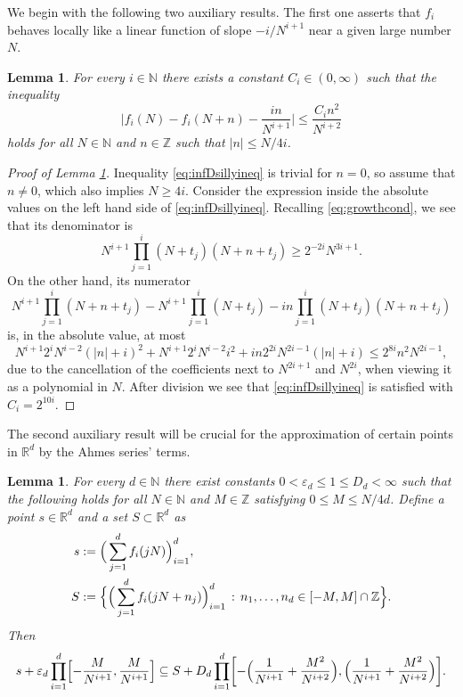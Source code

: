 \documentclass[11pt,letterpaper,reqno]{amsart}
\numberwithin{equation}{section}
\newtheorem{lemma}[theorem]{Lemma}
\theoremstyle{definition}
\numberwithin{equation}{section}
\begin{document}
We begin with the following two auxiliary results.
The first one asserts that $f_i$ behaves locally like a linear function of slope $-i/N^{i+1}$ near a given large number $N$.

\begin{lemma}\label{lm:infDest}
For every $i\in\mathbb{N}$ there exists a constant $C_i\in(0,\infty)$ such that the inequality
\begin{equation}\label{eq:infDsillyineq}
\Big| f_i(N) - f_i(N+n) - \frac{i n}{N^{i+1}} \Big| \leqslant \frac{C_i n^2}{N^{i+2}}
\end{equation}
holds for all $N\in\mathbb{N}$ and $n\in\mathbb{Z}$ such that $|n|\leqslant N/4i$.
\end{lemma}

\begin{proof}[Proof of Lemma \ref{lm:infDest}]
Inequality \eqref{eq:infDsillyineq} is trivial for $n=0$, so assume that $n\neq 0$, which also implies $N\geqslant 4i$.
Consider the expression inside the absolute values on the left hand side of \eqref{eq:infDsillyineq}.
Recalling \eqref{eq:growthcond}, we see that its denominator is
\[ N^{i+1} \prod_{j=1}^{i} (N+t_j)(N+n+t_j) \geqslant 2^{-2i} N^{3i+1}. \]
On the other hand, its numerator
\[ N^{i+1} \prod_{j=1}^{i} (N+n+t_j) - N^{i+1} \prod_{j=1}^{i} (N+t_j) - i n \prod_{j=1}^{i} (N+t_j)(N+n+t_j) \]
is, in the absolute value, at most
\[
N^{i+1} 2^i N^{i-2} (|n|+i)^2
+ N^{i+1} 2^i N^{i-2} i^2
+ i n 2^{2i} N^{2i-1} (|n|+i)
\leqslant 2^{8i} n^2 N^{2i-1},
\]
due to the cancellation of the coefficients next to $N^{2i+1}$ and $N^{2i}$, when viewing it as a polynomial in $N$.
After division we see that \eqref{eq:infDsillyineq} is satisfied with $C_i = 2^{10i}$.
\end{proof}

The second auxiliary result will be crucial for the approximation of certain points in $\mathbb{R}^d$ by the Ahmes series' terms.

\begin{lemma}\label{lm:quantest}
For every $d\in\mathbb{N}$ there exist constants $0<\varepsilon_d\leqslant 1\leqslant D_d<\infty$ such that the following holds for all $N\in\mathbb{N}$ and $M\in\mathbb{Z}$ satisfying $0\leqslant M\leqslant N/4d$.
Define a point $s\in\mathbb{R}^d$ and a set $S\subset\mathbb{R}^d$ as
\begin{align*}
s & := \Big( \sum_{j=1}^{d} f_i(j N) \Big)_{i=1}^{d}, \\
S & := \Bigl\{ \Big( \sum_{j=1}^{d} f_i(j N + n_j) \Big)_{i=1}^{d} \,:\, n_1,\ldots,n_d\in[-M,M]\cap\mathbb{Z} \Bigr\}.
\end{align*}
Then
\begin{equation}\label{eq:mainsubset}
s + \varepsilon_d \prod_{i=1}^{d} \Bigl[ -\frac{M}{N^{i+1}}, \frac{M}{N^{i+1}} \Bigr]
\subseteq S + D_d \prod_{i=1}^{d} \biggl[ -\Big( \frac{1}{N^{i+1}} +\frac{M^2}{N^{i+2}} \Big), \Big( \frac{1}{N^{i+1}} +\frac{M^2}{N^{i+2}} \Big) \biggr].
\end{equation}
\end{lemma}
\end{document}
